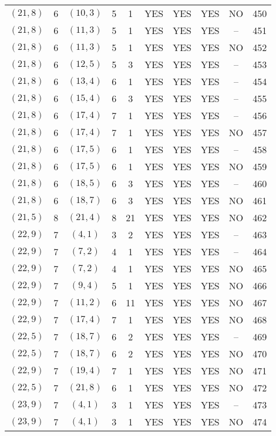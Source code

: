 \begin{longtable}{|c|c|c|c|c|c|c|c|c|c|}
$(21, 8)$ & 6 & $(10, 3)$ & 5 & 1 & YES & YES & YES & NO & 450\\
$(21, 8)$ & 6 & $(11, 3)$ & 5 & 1 & YES & YES & YES & -- & 451\\
$(21, 8)$ & 6 & $(11, 3)$ & 5 & 1 & YES & YES & YES & NO & 452\\
$(21, 8)$ & 6 & $(12, 5)$ & 5 & 3 & YES & YES & YES & -- & 453\\
$(21, 8)$ & 6 & $(13, 4)$ & 6 & 1 & YES & YES & YES & -- & 454\\
$(21, 8)$ & 6 & $(15, 4)$ & 6 & 3 & YES & YES & YES & -- & 455\\
$(21, 8)$ & 6 & $(17, 4)$ & 7 & 1 & YES & YES & YES & -- & 456\\
$(21, 8)$ & 6 & $(17, 4)$ & 7 & 1 & YES & YES & YES & NO & 457\\
$(21, 8)$ & 6 & $(17, 5)$ & 6 & 1 & YES & YES & YES & -- & 458\\
$(21, 8)$ & 6 & $(17, 5)$ & 6 & 1 & YES & YES & YES & NO & 459\\
$(21, 8)$ & 6 & $(18, 5)$ & 6 & 3 & YES & YES & YES & -- & 460\\
$(21, 8)$ & 6 & $(18, 7)$ & 6 & 3 & YES & YES & YES & NO & 461\\
$(21, 5)$ & 8 & $(21, 4)$ & 8 & 21 & YES & YES & YES & NO & 462\\
$(22, 9)$ & 7 & $(4, 1)$ & 3 & 2 & YES & YES & YES & -- & 463\\
$(22, 9)$ & 7 & $(7, 2)$ & 4 & 1 & YES & YES & YES & -- & 464\\
$(22, 9)$ & 7 & $(7, 2)$ & 4 & 1 & YES & YES & YES & NO & 465\\
$(22, 9)$ & 7 & $(9, 4)$ & 5 & 1 & YES & YES & YES & NO & 466\\
$(22, 9)$ & 7 & $(11, 2)$ & 6 & 11 & YES & YES & YES & NO & 467\\
$(22, 9)$ & 7 & $(17, 4)$ & 7 & 1 & YES & YES & YES & NO & 468\\
$(22, 5)$ & 7 & $(18, 7)$ & 6 & 2 & YES & YES & YES & -- & 469\\
$(22, 5)$ & 7 & $(18, 7)$ & 6 & 2 & YES & YES & YES & NO & 470\\
$(22, 9)$ & 7 & $(19, 4)$ & 7 & 1 & YES & YES & YES & NO & 471\\
$(22, 5)$ & 7 & $(21, 8)$ & 6 & 1 & YES & YES & YES & NO & 472\\
$(23, 9)$ & 7 & $(4, 1)$ & 3 & 1 & YES & YES & YES & -- & 473\\
$(23, 9)$ & 7 & $(4, 1)$ & 3 & 1 & YES & YES & YES & NO & 474\\

\end{longtable}
